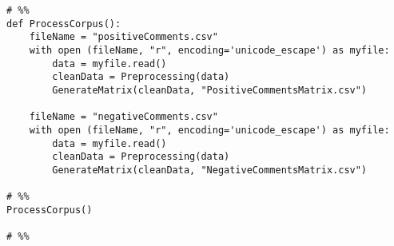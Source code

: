 \documentclass{article}
\begin{document}
\begin{verbatim}
# %%
def ProcessCorpus():
    fileName = "positiveComments.csv"
    with open (fileName, "r", encoding='unicode_escape') as myfile:
        data = myfile.read()
        cleanData = Preprocessing(data)
        GenerateMatrix(cleanData, "PositiveCommentsMatrix.csv")

    fileName = "negativeComments.csv"
    with open (fileName, "r", encoding='unicode_escape') as myfile:
        data = myfile.read()
        cleanData = Preprocessing(data)
        GenerateMatrix(cleanData, "NegativeCommentsMatrix.csv")

# %%
ProcessCorpus()

# %%
\end{verbatim}
\end{document}
